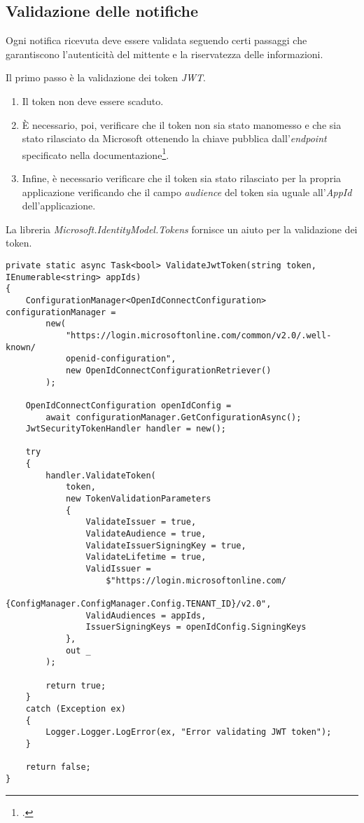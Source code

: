 \subsection{Validazione delle notifiche}

Ogni notifica ricevuta deve essere validata seguendo certi passaggi che garantiscono l'autenticità del mittente e la riservatezza delle informazioni.

\noindent Il primo passo è la validazione dei token \emph{JWT}. 
\begin{enumerate}
	\item Il token non deve essere scaduto.
	\item È necessario, poi, verificare che il token non sia stato manomesso e che sia stato rilasciato da Microsoft ottenendo la chiave pubblica dall'\emph{endpoint} specificato nella documentazione\footcite{site:rich-notification}.
	\item Infine, è necessario verificare che il token sia stato rilasciato per la propria applicazione verificando che il campo \emph{audience} del token sia uguale all'\emph{AppId} dell'applicazione.
\end{enumerate}

\noindent La libreria \emph{Microsoft.IdentityModel.Tokens} fornisce un aiuto per la validazione dei token.

\begin{lstlisting}
private static async Task<bool> ValidateJwtToken(string token, IEnumerable<string> appIds)
{
	ConfigurationManager<OpenIdConnectConfiguration> configurationManager =
		new(
			"https://login.microsoftonline.com/common/v2.0/.well-known/
			openid-configuration",
			new OpenIdConnectConfigurationRetriever()
		);

	OpenIdConnectConfiguration openIdConfig =
		await configurationManager.GetConfigurationAsync();
	JwtSecurityTokenHandler handler = new();

	try
	{
		handler.ValidateToken(
			token,
			new TokenValidationParameters
			{
				ValidateIssuer = true,
				ValidateAudience = true,
				ValidateIssuerSigningKey = true,
				ValidateLifetime = true,
				ValidIssuer =
					$"https://login.microsoftonline.com/
					{ConfigManager.ConfigManager.Config.TENANT_ID}/v2.0",
				ValidAudiences = appIds,
				IssuerSigningKeys = openIdConfig.SigningKeys
			},
			out _
		);

		return true;
	}
	catch (Exception ex)
	{
		Logger.Logger.LogError(ex, "Error validating JWT token");
	}

	return false;
}
\end{lstlisting}


